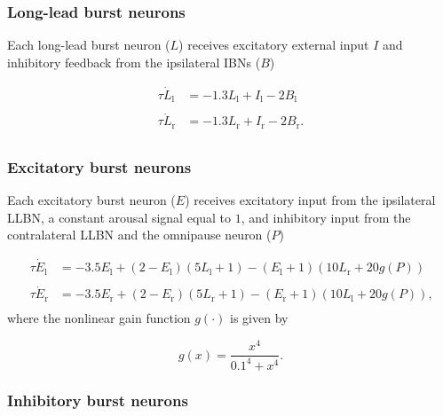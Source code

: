 \documentclass[10pt,a4paper,onecolumn]{article}
\begin{document}
\hypertarget{long-lead-burst-neurons}{%
\subsubsection{Long-lead burst neurons}\label{long-lead-burst-neurons}}

Each long-lead burst neuron (\(L\)) receives excitatory external input
\(I\) and inhibitory feedback from the ipsilateral IBNs (\(B\))

\begin{equation}
\begin{array}{ll}
\tau\dot L_\mathrm{l} &= -1.3L_\mathrm{l}+I_\mathrm{l}-2B_\mathrm{l} \\\\
\tau\dot L_\mathrm{r} &= -1.3L_\mathrm{r}+I_\mathrm{r}-2B_\mathrm{r} \textrm{.} \\
\end{array}
\label{eq:llbn}\end{equation}

\hypertarget{excitatory-burst-neurons}{%
\subsubsection{Excitatory burst
neurons}\label{excitatory-burst-neurons}}

Each excitatory burst neuron (\(E\)) receives excitatory input from the
ipsilateral LLBN, a constant arousal signal equal to \(1\), and
inhibitory input from the contralateral LLBN and the omnipause neuron
(\(P\))

\begin{equation}
\begin{array}{ll}
\tau\dot E_\mathrm{l} &= -3.5E_\mathrm{l}+(2-E_\mathrm{l})(5L_\mathrm{l}+1)-(E_\mathrm{l}+1)(10L_\mathrm{r}+20g(P)) \\\\
\tau\dot E_\mathrm{r} &= -3.5E_\mathrm{r}+(2-E_\mathrm{r})(5L_\mathrm{r}+1)-(E_\mathrm{r}+1)(10L_\mathrm{l}+20g(P)) \textrm{,} \\
\end{array}
\label{eq:ebn}\end{equation} where the nonlinear gain function
\(g(\cdot)\) is given by

\begin{equation}
g(x) = \frac{x^4}{0.1^4+x^4} \textrm{.}
\label{eq:gain}\end{equation}

\hypertarget{inhibitory-burst-neurons}{%
\subsubsection{Inhibitory burst
neurons}\label{inhibitory-burst-neurons}}
\end{document}

